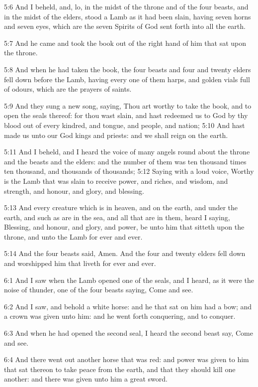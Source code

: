 5:6 And I beheld, and, lo, in the midst of the throne and of the four beasts, and in the midst of the elders, stood a Lamb as it had been slain, having seven horns and seven eyes, which are the seven Spirits of God sent forth into all the earth.

5:7 And he came and took the book out of the right hand of him that sat upon the throne.

5:8 And when he had taken the book, the four beasts and four and twenty elders fell down before the Lamb, having every one of them harps, and golden vials full of odours, which are the prayers of saints.

5:9 And they sung a new song, saying, Thou art worthy to take the book, and to open the seals thereof: for thou wast slain, and hast redeemed us to God by thy blood out of every kindred, and tongue, and people, and nation; 5:10 And hast made us unto our God kings and priests: and we shall reign on the earth.

5:11 And I beheld, and I heard the voice of many angels round about the throne and the beasts and the elders: and the number of them was ten thousand times ten thousand, and thousands of thousands; 5:12 Saying with a loud voice, Worthy is the Lamb that was slain to receive power, and riches, and wisdom, and strength, and honour, and glory, and blessing.

5:13 And every creature which is in heaven, and on the earth, and under the earth, and such as are in the sea, and all that are in them, heard I saying, Blessing, and honour, and glory, and power, be unto him that sitteth upon the throne, and unto the Lamb for ever and ever.

5:14 And the four beasts said, Amen. And the four and twenty elders fell down and worshipped him that liveth for ever and ever.

6:1 And I saw when the Lamb opened one of the seals, and I heard, as it were the noise of thunder, one of the four beasts saying, Come and see.

6:2 And I saw, and behold a white horse: and he that sat on him had a bow; and a crown was given unto him: and he went forth conquering, and to conquer.

6:3 And when he had opened the second seal, I heard the second beast say, Come and see.

6:4 And there went out another horse that was red: and power was given to him that sat thereon to take peace from the earth, and that they should kill one another: and there was given unto him a great sword.

